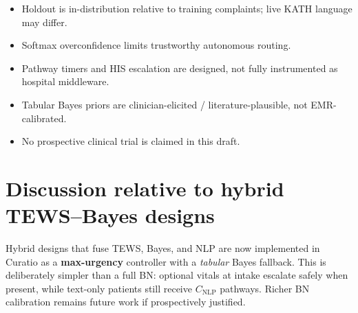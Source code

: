 \begin{itemize}
  \item Holdout is in-distribution relative to training complaints; live KATH language may differ.
  \item Softmax overconfidence limits trustworthy autonomous routing.
  \item Pathway timers and HIS escalation are designed, not fully instrumented as hospital middleware.
  \item Tabular Bayes priors are clinician-elicited / literature-plausible, not EMR-calibrated.
  \item No prospective clinical trial is claimed in this draft.
\end{itemize}

\section{Discussion relative to hybrid TEWS--Bayes designs}

Hybrid designs that fuse TEWS, Bayes, and NLP are now implemented in Curatio as a \textbf{max-urgency} controller with a \emph{tabular} Bayes fallback. This is deliberately simpler than a full BN: optional vitals at intake escalate safely when present, while text-only patients still receive \(C_{\mathrm{NLP}}\) pathways. Richer BN calibration remains future work if prospectively justified.
